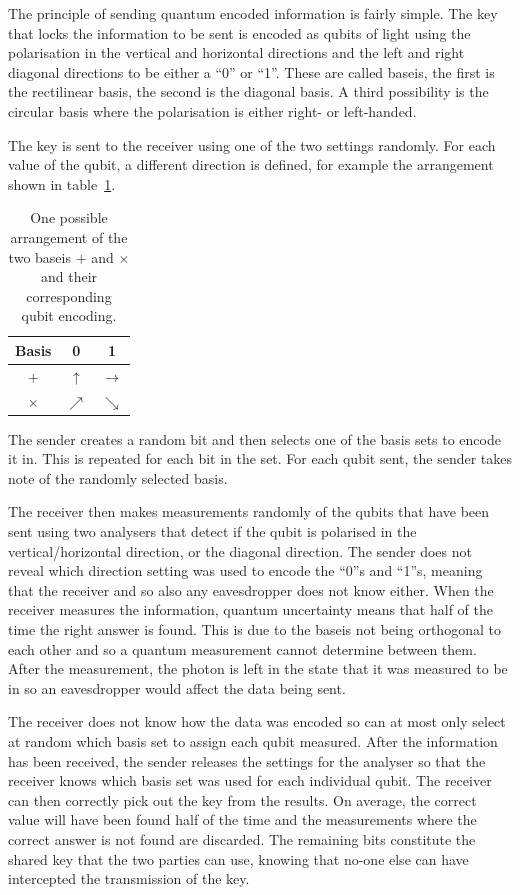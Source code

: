 The principle of sending quantum encoded information is fairly simple. The key that locks the information to be sent is encoded as qubits of light using the polarisation in the vertical and horizontal directions and the left and right diagonal directions to be either a ``0'' or ``1''. These are called baseis, the first is the rectilinear basis, the second is the diagonal basis. A third possibility is the circular basis where the polarisation is either right- or left-handed.

The key is sent to the receiver using one of the two settings randomly. For each value of the qubit, a different direction is defined, for example the arrangement shown in table~\ref{tab:basis}.
\begin{table}[h!t]
	\centering
	\begin{tabular}{c|c|c}
		Basis & 0 & 1 \\ \hline
		$+$ & $\uparrow$ & $\rightarrow$ \\
		$\times$ & $\nearrow$ & $\searrow$
	\end{tabular}
	\caption{\label{tab:basis}One possible arrangement of the two baseis $+$ and $\times$ and their corresponding qubit encoding.}
\end{table}

The sender creates a random bit and then selects one of the basis sets to encode it in. This is repeated for each bit in the set. For each qubit sent, the sender takes note of the randomly selected basis.

The receiver then makes measurements randomly of the qubits that have been sent using two analysers that detect if the qubit is polarised in the vertical/horizontal direction, or the diagonal direction. The sender does not reveal which direction setting was used to encode the ``0''s and ``1''s, meaning that the receiver and so also any eavesdropper does not know either. When the receiver measures the information, quantum uncertainty means that half of the time the right answer is found. This is due to the baseis not being orthogonal to each other and so a quantum measurement cannot determine between them. After the measurement, the photon is left in the state that it was measured to be in so an eavesdropper would affect the data being sent. 

The receiver does not know how the data was encoded so can at most only select at random which basis set to assign each qubit measured. After the information has been received, the sender releases the settings for the analyser so that the receiver knows which basis set was used for each individual qubit. The receiver can then correctly pick out the key from the results. On average, the correct value will have been found half of the time and the measurements where the correct answer is not found are discarded. The remaining bits constitute the shared key that the two parties can use, knowing that no-one else can have intercepted the transmission of the key.

